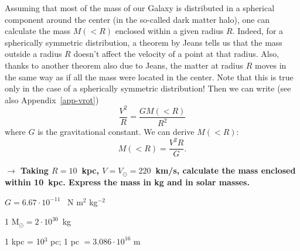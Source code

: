 Assuming that most of the mass of our Galaxy is distributed in 
a spherical component around the center 
(in the so-called dark matter halo), one can calculate the
mass $M(<R)$ enclosed within a given radius $R$. 
Indeed, for a spherically symmetric distribution, a theorem
by Jeans tells us that the mass outside a radius $R$ doesn't
affect the velocity of a point at that radius. 
Also, thanks to another theorem also due to Jeans, 
the matter at radius $R$ moves in the same way as if all the
mass were located in the center. 
Note that this is true only in the case of a spherically symmetric
distribution!
Then we can write (see also Appendix~\ref{app-vrot})
\begin{equation}
\frac{V^2}{R}= \frac{GM(< R)}{R^2}
\end{equation}
where $G$ is the gravitational constant. 
We can derive $M(< R)$: 
\begin{equation}
\boxed{M(<R) =  \frac{V^2 R}{G}. }
\end{equation}

{\bf{$\rightarrow$ Taking $R = 10$~kpc, $V= V_\odot = 220$~km/s, 
calculate the mass enclosed within 10~kpc.  Express the mass in 
kg and in solar masses. }}

\bigskip
$G = 6.67 \cdot 10^{-11}$ ~N m$^2$ kg$^{-2}$

1 M$_\odot = 2 \cdot 10^{30}$~kg

1 kpc = 10$^3$ pc; 1 pc $= 3.086\cdot 10^{16}$ m

